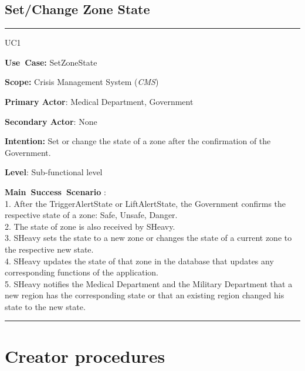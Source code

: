 \subsection{Set/Change Zone State}
\vspace{0.5cm}
\hrule
\vspace{0.5cm}
\begin{lyxlist}{UC1}
\small{
\item [\textbf{Use~Case:}] SetZoneState
\item [\textbf{Scope:}] Crisis Management System (\emph{CMS})
\item [\textbf{Primary Actor}:] Medical Department, Government
\item [\textbf{Secondary Actor}:] None
\item [\textbf{Intention:}] Set or change the state of a zone 
after the confirmation of the Government.\\
\item [\textbf{Level}:]Sub-functional level
\item [\textbf{Main~Success~Scenario}]:\\
1. After the TriggerAlertState or LiftAlertState, the Government confirms
 the respective state of a zone: Safe, Unsafe, Danger.\\
2. The state of zone is also received by SHeavy.\\
3. SHeavy sets the state to a new zone or changes the state of a current zone to 
the respective new state.\\
4. SHeavy updates the state of that zone in the database that updates any
corresponding functions of the application.\\
5. SHeavy notifies the Medical Department and the Military Department that a new 
region has the corresponding state or that an existing region changed his state
to the new state.\\
}
\end{lyxlist}
\hrule
\vspace{0.5cm} 

\section{Creator procedures}


